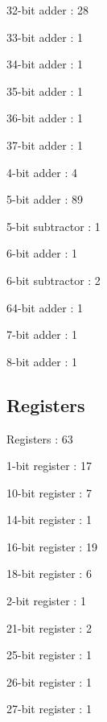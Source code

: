 \documentclass[letterpaper, 11 pt, conference]{article}
\begin{document}
 32-bit adder                                          : 28

 33-bit adder                                          : 1

 34-bit adder                                          : 1

 35-bit adder                                          : 1

 36-bit adder                                          : 1

 37-bit adder                                          : 1

 4-bit adder                                           : 4

 5-bit adder                                           : 89

 5-bit subtractor                                      : 1

 6-bit adder                                           : 1

 6-bit subtractor                                      : 2

 64-bit adder                                          : 1

 7-bit adder                                           : 1

 8-bit adder                                           : 1

\subsection{ Registers} 
Registers                                            : 63

 1-bit register                                        : 17

 10-bit register                                       : 7

 14-bit register                                       : 1

 16-bit register                                       : 19

 18-bit register                                       : 6

 2-bit register                                        : 1

 21-bit register                                       : 2

 25-bit register                                       : 1

 26-bit register                                       : 1

 27-bit register                                       : 1
\end{document}
